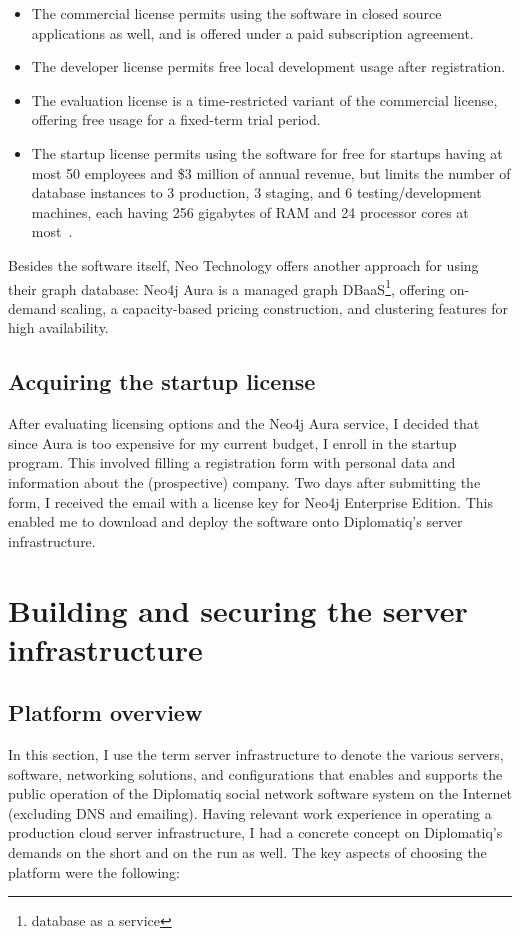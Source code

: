 \begin{itemize}
\item The commercial license permits using the software in closed source applications as well, and is offered under a paid subscription agreement.
\item The developer license permits free local development usage after registration.
\item The evaluation license is a time-restricted variant of the commercial license, offering free usage for a fixed-term trial period.
\item The startup license permits using the software for free for startups having at most 50 employees and \$3 million of annual revenue, but limits the number of database instances to 3 production, 3 staging, and 6 testing/development machines, each having 256 gigabytes of RAM and 24 processor cores at most~\cite{neo4j-startup-program}.
\end{itemize}

Besides the software itself, Neo Technology offers another approach for using their graph database: Neo4j Aura is a managed graph DBaaS\footnote{database as a service}, offering on-demand scaling, a capacity-based pricing construction, and clustering features for high availability.

\subsection{Acquiring the startup license}

After evaluating licensing options and the Neo4j Aura service, I decided that since Aura is too expensive for my current budget, I enroll in the startup program. This involved filling a registration form with personal data and information about the (prospective) company. Two days after submitting the form, I received the email with a license key for Neo4j Enterprise Edition. This enabled me to download and deploy the software onto Diplomatiq's server infrastructure.

\section{Building and securing the server infrastructure}

\subsection{Platform overview}

In this section, I use the term server infrastructure to denote the various servers, software, networking solutions, and configurations that enables and supports the public operation of the Diplomatiq social network software system on the Internet (excluding DNS and emailing). Having relevant work experience in operating a production cloud server infrastructure, I had a concrete concept on Diplomatiq's demands on the short and on the run as well. The key aspects of choosing the platform were the following:

